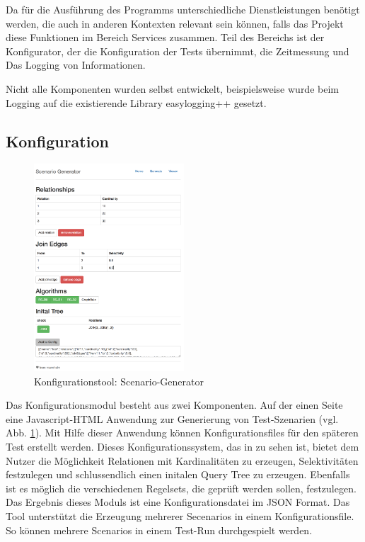Da für die Ausführung des Programms unterschiedliche Dienstleistungen benötigt werden, die auch in anderen Kontexten relevant sein können, falls das Projekt diese Funktionen im Bereich Services zusammen. Teil des Bereichs ist der Konfigurator, der die Konfiguration der Tests übernimmt, die Zeitmessung und Das Logging von Informationen.

Nicht alle Komponenten wurden selbst entwickelt, beispielsweise wurde beim Logging auf die existierende Library easylogging++ gesetzt.

\subsection{Konfiguration}


\begin{figure}[ht]
  \centering
  \includegraphics[width=0.5\textwidth]{04_Implementierung/ScenarioGenerator.png}
  \caption{Konfigurationstool: Scenario-Generator}
  \label{ScenarioGenerator}
\end{figure}

Das Konfigurationsmodul besteht aus zwei Komponenten. Auf der einen Seite eine Javascript-HTML Anwendung zur Generierung von Test-Szenarien (vgl. Abb. \ref{ScenarioGenerator}). Mit Hilfe dieser Anwendung können Konfigurationsfiles für den späteren Test erstellt werden. Dieses Konfigurationssystem, das in  zu sehen ist, bietet dem Nutzer die Möglichkeit Relationen mit Kardinalitäten zu erzeugen, Selektivitäten festzulegen und schlussendlich einen initalen Query Tree zu erzeugen. Ebenfalls ist es möglich die verschiedenen Regelsets, die geprüft werden sollen, festzulegen.
Das Ergebnis dieses Moduls ist eine Konfigurationsdatei im JSON Format. Das Tool unterstützt die Erzeugung mehrerer Secenarios in einem Konfigurationsfile. So können mehrere Scenarios in einem Test-Run durchgespielt werden.

